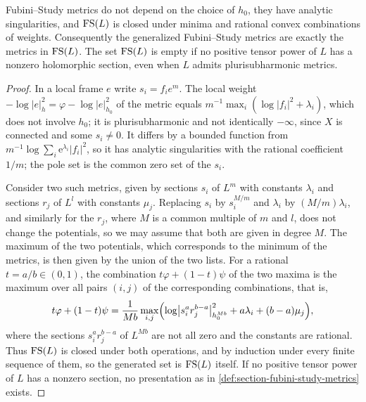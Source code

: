 \begin{proposition}\label{prop:fubini-study-finite-operations}
Fubini--Study metrics do not depend on the choice of $h_0$, they have analytic singularities, and $\mathrm{FS}(L)$ is closed under minima and rational convex combinations of weights. Consequently the generalized Fubini--Study metrics are exactly the metrics in $\mathrm{FS}(L)$. The set $\mathrm{FS}(L)$ is empty if no positive tensor power of $L$ has a nonzero holomorphic section, even when $L$ admits plurisubharmonic metrics.
\end{proposition}
\begin{proof}
In a local frame $e$ write $s_i=f_ie^m$. The local weight $-\log|e|_h^2=\varphi-\log|e|_{h_0}^2$ of the metric equals $m^{-1}\max_i(\log|f_i|^2+\lambda_i)$, which does not involve $h_0$; it is plurisubharmonic and not identically $-\infty$, since $X$ is connected and some $s_i\ne0$. It differs by a bounded function from $m^{-1}\log\sum_i\mathrm e^{\lambda_i}|f_i|^2$, so it has analytic singularities with the rational coefficient $1/m$; the pole set is the common zero set of the $s_i$.

Consider two such metrics, given by sections $s_i$ of $L^m$ with constants $\lambda_i$ and sections $r_j$ of $L^l$ with constants $\mu_j$. Replacing $s_i$ by $s_i^{M/m}$ and $\lambda_i$ by $(M/m)\lambda_i$, and similarly for the $r_j$, where $M$ is a common multiple of $m$ and $l$, does not change the potentials, so we may assume that both are given in degree $M$. The maximum of the two potentials, which corresponds to the minimum of the metrics, is then given by the union of the two lists. For a rational $t=a/b\in(0,1)$, the combination $t\varphi+(1-t)\psi$ of the two maxima is the maximum over all pairs $(i,j)$ of the corresponding combinations, that is,
\[
 t\varphi+(1-t)\psi=\frac1{Mb}\max_{i,j}\Bigl(\log\bigl|s_i^ar_j^{b-a}\bigr|_{h_0^{Mb}}^2+a\lambda_i+(b-a)\mu_j\Bigr),
\]
where the sections $s_i^ar_j^{b-a}$ of $L^{Mb}$ are not all zero and the constants are rational. Thus $\mathrm{FS}(L)$ is closed under both operations, and by induction under every finite sequence of them, so the generated set is $\mathrm{FS}(L)$ itself. If no positive tensor power of $L$ has a nonzero section, no presentation as in \cref{def:section-fubini-study-metrics} exists.
\end{proof}

